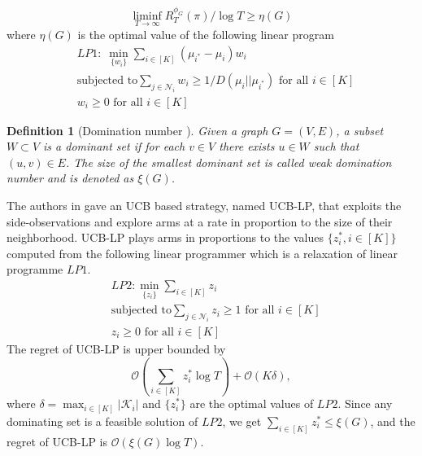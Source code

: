 \documentclass{article}
\newtheorem{definition}{Definition}
\begin{document}
\begin{equation}
	\liminf_{T \rightarrow \infty} R^{\phi_G}_T(\pi)/\log T \geq \eta(G)
	\end{equation}
	where $\eta(G)$ is the optimal value of the following linear program
	\begin{align}
	& LP1: \;\displaystyle\min_{\{w_i\}}\sum_{i \in [K]}(\mu_{i^*}- \mu_i) w_i \nonumber\\
	\label{eqn:LowerBoundLP}
	& \mbox{subjected to} \sum_{j \in \mathcal{N}_i}w_i\geq 1/D(\mu_i || \mu_{i^*}) \mbox{  for all } i\in [K]\\
	& w_i \geq 0 \mbox{ for all } i \in [K] \nonumber
	\end{align}
	
\begin{definition}[Domination number \cite{Sigmetrics15_StochasticBanditsWithSideObservations_BuccapatnamEriyilmazShroff}]
	Given a graph $G=(V,E)$, a subset $W\subset V$ is a dominant set if for each $v\in V$ there exists $u \in W$ such that $(u,v)\in E$. The size of the smallest dominant set is called weak domination number and is denoted as $\xi(G)$. 
\end{definition} 	
	
The authors in \cite{Sigmetrics15_StochasticBanditsWithSideObservations_BuccapatnamEriyilmazShroff} gave an UCB based strategy, named UCB-LP, that exploits the side-observations and explore arms at a rate in proportion to the size of their neighborhood. UCB-LP plays arms in proportions to the values $\{z_i^*, i\in [K]\}$ computed from the following linear programmer which is a relaxation of linear programme $LP1$. 
	\begin{align}
	& LP2: \displaystyle\min_{\{z_i\}}\sum_{i \in [K]} z_i \nonumber\\
	\label{eqn:LowerRelaxedBoundLP}
	& \mbox{subjected to} \sum_{j \in \mathcal{N}_i}z_i\geq 1 \mbox{  for all } i\in [K]\\
	& z_i \geq 0 \mbox{ for all } i \in [K] \nonumber
	\end{align}
The regret of UCB-LP is upper bounded by 
\begin{equation}
\label{eqn:UCBLPUpperBound}
\mathcal{O}\left(\sum_{i\in [K]} z_i^* \log T\right) +\mathcal{O}(K\delta),
\end{equation}
where $\delta= \max_{i \in [K]}|\mathcal{K}_i|$ and $\{z_i^*\}$ are the optimal values of $LP2$. Since any dominating set is a feasible solution of $LP2$, we get $\sum_{i\in [K]}z_i^*\leq \xi(G)$, and the regret of UCB-LP is $\mathcal{O}(\xi(G)\log T)$. 
\end{document}
